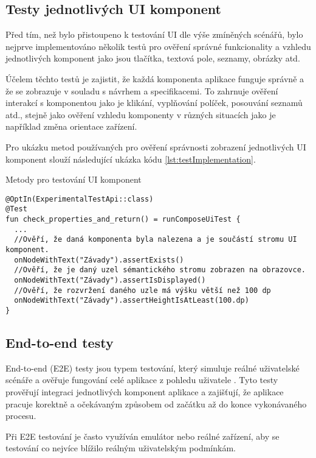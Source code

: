 \subsection{Testy jednotlivých UI komponent}
Před tím, než bylo přistoupeno k testování UI dle výše zmíněných scénářů, bylo nejprve implementováno několik testů pro ověření správné 
funkcionality a vzhledu jednotlivých komponent jako jsou tlačítka, textová pole, seznamy, obrázky atd.

Účelem těchto testů je zajistit, že každá komponenta aplikace funguje správně a že se zobrazuje v souladu s návrhem a specifikacemi. 
To zahrnuje ověření interakcí s komponentou jako je klikání, vyplňování políček, posouvání seznamů atd., stejně jako ověření vzhledu komponenty v 
různých situacích jako je například změna orientace zařízení.

\bigskip

Pro ukázku metod používaných pro ověření správnosti zobrazení jednotlivých UI komponent slouží následující ukázka kódu \ref{lst:testImplementation}.

\begin{listing}[H]
  \caption{Metody pro testování UI komponent}\label{lst:testImplementation}
  \begin{verbatim}
@OptIn(ExperimentalTestApi::class)
@Test
fun check_properties_and_return() = runComposeUiTest {
  ...
  //Ověří, že daná komponenta byla nalezena a je součástí stromu UI komponent.
  onNodeWithText("Závady").assertExists()
  //Ověří, že je daný uzel sémantického stromu zobrazen na obrazovce.
  onNodeWithText("Závady").assertIsDisplayed()
  //Ověří, že rozvržení daného uzle má výšku větší než 100 dp
  onNodeWithText("Závady").assertHeightIsAtLeast(100.dp)
}
\end{verbatim}
\end{listing}

\subsection{End-to-end testy}
End-to-end (E2E) testy jsou typem testování, který simuluje reálné uživatelské scénáře a ověřuje fungování celé aplikace z pohledu uživatele \cite{testingE2E}.
Tyto testy prověřují integraci jednotlivých komponent aplikace a zajišťují, že aplikace pracuje korektně a očekávaným způsobem od začátku až 
do konce vykonávaného procesu.

Při E2E testování je často využíván emulátor nebo reálné zařízení, aby se testování co nejvíce blížilo reálným uživatelským podmínkám. 

